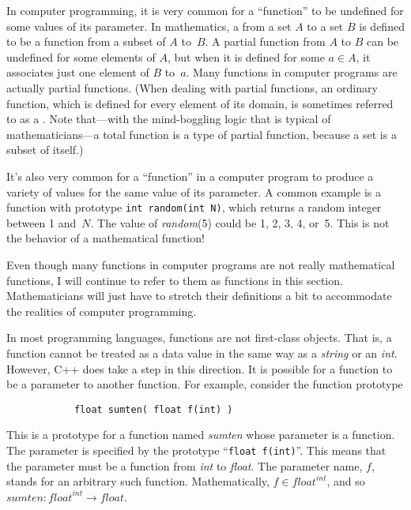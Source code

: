 In computer programming, it is very common for a ``function'' to be
undefined for some values of its parameter.  In mathematics,
a  from a set $A$ to
a set $B$ is defined to be a function from a subset of $A$ to~$B$.
A partial function from $A$ to $B$ can be undefined for some
elements of $A$, but when it is defined for some $a\in A$,
it associates just one element of $B$ to~$a$.  Many functions
in computer programs are actually partial functions.  (When 
dealing with partial functions, an ordinary function, which is
defined for every element of its domain, is sometimes referred to
as a .  Note that---with the mind-boggling
logic that is typical of mathematicians---a total function is
a type of partial function, because a set is a subset of itself.)

It's also very common for a ``function'' in a computer program
to produce a variety of values for the same value of its parameter.
A common example is a function with prototype
\verb=int random(int N)=, which returns a random integer between
1 and~$N$.  The value of \textit{random}(5) could be 1, 2, 3, 4, or~5.
This is not the behavior of a mathematical function!

Even though many functions in computer programs are not really
mathematical functions, I will continue to refer to them as
functions in this section.  Mathematicians will just have to stretch
their definitions a bit to accommodate the realities of computer
programming.

\medbreak

In most programming languages, functions are not first-class
objects.  That is, a function cannot
be treated as a data value in the same way as a \textit{string}
or an \textit{int}.  However, C++ does take a step in this
direction.  It is possible for a function to be a parameter
to another function.  For example, consider the function
prototype
\begin{verbatim}
            float sumten( float f(int) )
\end{verbatim}
This is a prototype for a function named \textit{sumten} whose
parameter is a function.  The parameter is specified by the
prototype ``\verb=float f(int)=''.  This means that the parameter
must be a function from \textit{int} to \textit{float}.  The parameter
name, $f$, stands for an arbitrary such function.  Mathematically,
$f\in \textit{float}^{\textit{int}}$, and so
$\textit{sumten}\colon \textit{float}^{\textit{int}}\to\textit{float}$.

